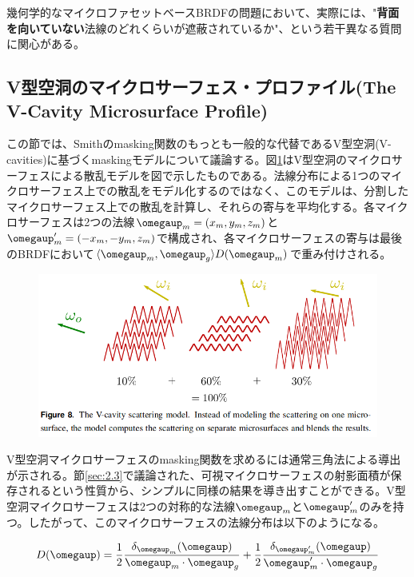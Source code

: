 \documentclass[a4j,xelatex,ja=standard]{bxjsarticle}
\begin{document}
幾何学的なマイクロファセットベースBRDFの問題において、実際には、"\textbf{背面を向いていない}法線のどれくらいが遮蔽されているか"、という若干異なる質問に関心がある。

\subsection{V型空洞のマイクロサーフェス・プロファイル(The V-Cavity Microsurface Profile)}

この節では、Smithのmasking関数のもっとも一般的な代替であるV型空洞(V-cavities)に基づくmaskingモデルについて議論する。図\ref{fig:8}はV型空洞のマイクロサーフェスによる散乱モデルを図で示したものである。法線分布による1つのマイクロサーフェス上での散乱をモデル化するのではなく、このモデルは、分割したマイクロサーフェス上での散乱を計算し、それらの寄与を平均化する。各マイクロサーフェスは2つの法線$\boldsymbol{\omegaup}_m = (x_m, y_m, z_m)$と$\boldsymbol{\omegaup}_m' = (-x_m, -y_m, z_m)$で構成され、各マイクロサーフェスの寄与は最後のBRDFにおいて$\langle \boldsymbol{\omegaup}_m, \boldsymbol{\omegaup}_g \rangle D(\boldsymbol{\omegaup}_m)$で重み付けされる。

\begin{figure}
    \includegraphics[width=\textwidth]{Figure8.png}
    \caption{}
    \label{fig:8}
\end{figure}

V型空洞マイクロサーフェスのmasking関数を求めるには通常三角法による導出が示される。節\ref{sec:2.3}で議論された、可視マイクロサーフェスの射影面積が保存されるという性質から、シンプルに同様の結果を導き出すことができる。V型空洞マイクロサーフェスは2つの対称的な法線$\boldsymbol{\omegaup}_m$と$\boldsymbol{\omegaup}_m'$のみを持つ。したがって、このマイクロサーフェスの法線分布は以下のようになる。

\begin{equation}
    D(\boldsymbol{\omegaup}) = \frac{1}{2} \frac{\delta_{\boldsymbol{\omegaup}_m}(\boldsymbol{\omegaup})}{\boldsymbol{\omegaup}_m \cdot \boldsymbol{\omegaup}_g} + \frac{1}{2} \frac{\delta_{\boldsymbol{\omegaup}_m'}(\boldsymbol{\omegaup})}{\boldsymbol{\omegaup}_m' \cdot \boldsymbol{\omegaup}_g}
    \label{eq:44}
\end{equation}
\end{document}
